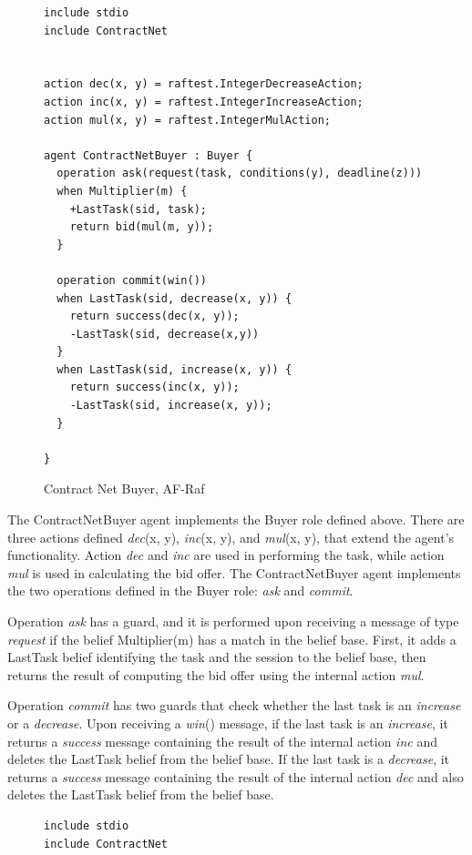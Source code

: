 \documentclass[a4paper,12pt,oneside,fleqn]{book} %
\begin{document}
{\begin{figure}\footnotesize %
\begin{verbatim}
include stdio
include ContractNet


action dec(x, y) = raftest.IntegerDecreaseAction;
action inc(x, y) = raftest.IntegerIncreaseAction;
action mul(x, y) = raftest.IntegerMulAction;

agent ContractNetBuyer : Buyer {
  operation ask(request(task, conditions(y), deadline(z)))
  when Multiplier(m) {
    +LastTask(sid, task);
    return bid(mul(m, y));
  }

  operation commit(win())
  when LastTask(sid, decrease(x, y)) {
    return success(dec(x, y));
    -LastTask(sid, decrease(x,y))
  }
  when LastTask(sid, increase(x, y)) {
    return success(inc(x, y));
    -LastTask(sid, increase(x, y));
  }

}
\end{verbatim}
\caption{Contract Net Buyer, AF-Raf}
\label{fig:contract-buyer}
\end{figure} %

The ContractNetBuyer agent implements the Buyer role defined above. There
are three actions defined \textit{dec}(x, y), \textit{inc}(x, y), and
\textit{mul}(x, y), that extend the agent's functionality. Action
\textit{dec} and \textit{inc} are used in performing the task,
while action \textit{mul} is used in calculating the bid offer. The
ContractNetBuyer agent implements the two operations defined in the Buyer
role: \textit{ask} and \textit{commit}.

Operation \textit{ask} has a guard, and it is performed upon receiving a
message of type \textit{request} if the belief Multiplier(m) has a match in
the belief base. First, it adds a LastTask belief identifying the task and
the session to the belief base, then returns the result of computing the
bid offer using the internal action \textit{mul}.

Operation \textit{commit} has two guards that check whether the last task is
an \textit{increase} or a \textit{decrease}. Upon receiving a
\textit{win}() message, if the last task is an \textit{increase}, it returns
a \textit{success} message containing the result of the internal action
\textit{inc} and deletes the LastTask belief from the belief base. If the last
task is a \textit{decrease}, it returns a \textit{success} message
containing the result of the internal action \textit{dec} and also deletes
the LastTask belief from the belief base.

\begin{figure}\footnotesize %
\begin{verbatim}
include stdio
include ContractNet


\end{verbatim}
\end{figure}}
\end{document}

